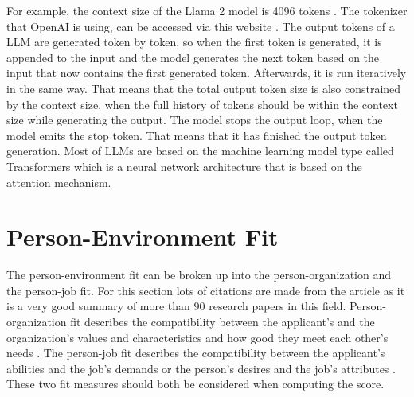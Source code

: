 \documentclass[draft,final]{thesisclass} %
\begin{document}
For example, the context size of the Llama 2 model is 4096 tokens \parencite[47]{llama2}.
The tokenizer that OpenAI is using, can be accessed via this website \textcite{openai_tokenizer}.
The output tokens of a \acs{LLM} are generated token by token, so when the first token is generated, it is appended to the input and the model generates the next token based on the input that now contains the first generated token. Afterwards, it is run iteratively in the same way.
That means that the total output token size is also constrained by the context size, when the full history of tokens should be within the context size while generating the output.
The model stops the output loop, when the model emits the stop token. That means that it has finished the output token generation.
Most of \acs{LLM}s are based on the machine learning model type called Transformers \parencite[1]{transformer} which is a neural network architecture that is based on the attention mechanism.

\section{Person-Environment Fit}
The person-environment fit can be broken up into the person-organization and the person-job fit.
For this section lots of citations are made from the article \textcite{po_and_pj_fit_literature_review} as it is a very good summary of more than $90$ research papers in this field.
Person-organization fit describes the compatibility between the applicant's and the organization's values and characteristics and how good they meet each other's needs \parencite[179]{po_and_pj_fit_literature_review}.
The person-job fit describes the compatibility between the applicant's abilities and the job's demands or the person's desires and the job's attributes \parencite[179]{po_and_pj_fit_literature_review}.
These two fit measures should both be considered when computing the score.
\end{document}
